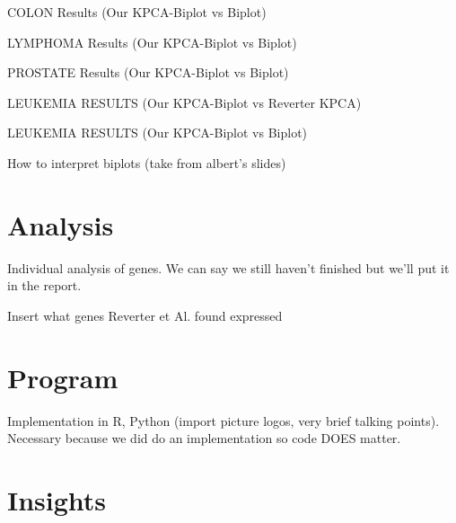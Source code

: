 \documentclass[serif]{beamer}
\begin{document}
	\begin{frame}
		COLON Results (Our KPCA-Biplot vs Biplot)
	\end{frame}
	
	\begin{frame}
		LYMPHOMA Results (Our KPCA-Biplot vs Biplot)
	\end{frame}
	
	\begin{frame}
		PROSTATE Results (Our KPCA-Biplot vs Biplot)
	\end{frame}
	
	\begin{frame}
		LEUKEMIA RESULTS (Our KPCA-Biplot vs Reverter KPCA)
	\end{frame}	
	
	\begin{frame}
		LEUKEMIA RESULTS (Our KPCA-Biplot vs Biplot)
	\end{frame}

	\begin{frame}
		How to interpret biplots (take from albert's slides)
	\end{frame}
	
	
	\section{Analysis}
	
	\begin{frame}
		Individual analysis of genes. We can say we still haven't finished but
		we'll put it in the report.
	\end{frame}
	
	\begin{frame}
		Insert what genes Reverter et Al. found expressed
	\end{frame}
	
	
	\section{Program}
	
	\begin{frame}
		Implementation in R, Python (import picture logos, very brief talking points). Necessary because we did do an implementation so code DOES
		matter.
	\end{frame}
	
	
	\section{Insights}
	
\end{document}
